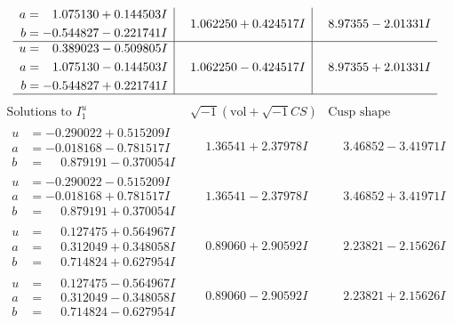\documentclass[1p]{elsarticle_modified}
\theoremstyle{definition}
\newcommand{\I}{\sqrt{-1}}
\begin{document}
$$\begin{array}{c|c|c}
\begin{aligned}
a &= \phantom{-}1.075130 + 0.144503 I \\
b &= -0.544827 - 0.221741 I\end{aligned}
 & \phantom{-}1.062250 + 0.424517 I & \phantom{-}8.97355 - 2.01331 I \\ \hline\begin{aligned}
u &= \phantom{-}0.389023 - 0.509805 I \\
a &= \phantom{-}1.075130 - 0.144503 I \\
b &= -0.544827 + 0.221741 I\end{aligned}
 & \phantom{-}1.062250 - 0.424517 I & \phantom{-}8.97355 + 2.01331 I\\
 \hline 
 \end{array}$$\newpage$$\begin{array}{c|c|c}  
\text{Solutions to }I^u_{1}& \I (\text{vol} + \sqrt{-1}CS) & \text{Cusp shape}\\
 \hline 
\begin{aligned}
u &= -0.290022 + 0.515209 I \\
a &= -0.018168 - 0.781517 I \\
b &= \phantom{-}0.879191 - 0.370054 I\end{aligned}
 & \phantom{-}1.36541 + 2.37978 I & \phantom{-}3.46852 - 3.41971 I \\ \hline\begin{aligned}
u &= -0.290022 - 0.515209 I \\
a &= -0.018168 + 0.781517 I \\
b &= \phantom{-}0.879191 + 0.370054 I\end{aligned}
 & \phantom{-}1.36541 - 2.37978 I & \phantom{-}3.46852 + 3.41971 I \\ \hline\begin{aligned}
u &= \phantom{-}0.127475 + 0.564967 I \\
a &= \phantom{-}0.312049 + 0.348058 I \\
b &= \phantom{-}0.714824 + 0.627954 I\end{aligned}
 & \phantom{-}0.89060 + 2.90592 I & \phantom{-}2.23821 - 2.15626 I \\ \hline\begin{aligned}
u &= \phantom{-}0.127475 - 0.564967 I \\
a &= \phantom{-}0.312049 - 0.348058 I \\
b &= \phantom{-}0.714824 - 0.627954 I\end{aligned}
 & \phantom{-}0.89060 - 2.90592 I & \phantom{-}2.23821 + 2.15626 I \\ \hline\begin{aligned}

\end{aligned}
\end{array}$$
\end{document}
